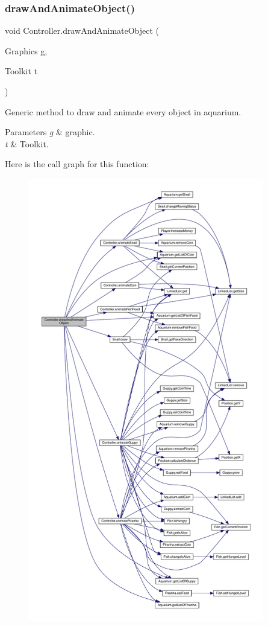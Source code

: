 \subsubsection{\texorpdfstring{draw\+And\+Animate\+Object()}{drawAndAnimateObject()}}
{\footnotesize\ttfamily void Controller.\+draw\+And\+Animate\+Object (\begin{DoxyParamCaption}\item[{Graphics}]{g,  }\item[{Toolkit}]{t }\end{DoxyParamCaption})\hspace{0.3cm}{\ttfamily [inline]}}

Generic method to draw and animate every object in aquarium. 
\begin{DoxyParams}{Parameters}
{\em g} & graphic. \\
\hline
{\em t} & Toolkit. \\
\hline
\end{DoxyParams}
Here is the call graph for this function\+:
\nopagebreak
\begin{figure}[H]
\begin{center}
\leavevmode
\includegraphics[height=550pt]{class_controller_afcc995c6e49e732f0542a4dee21921d2_cgraph}
\end{center}
\end{figure}
\mbox{\label{class_controller_a42fbd01fdeefdf2f40f85230f40d8be8}} 
